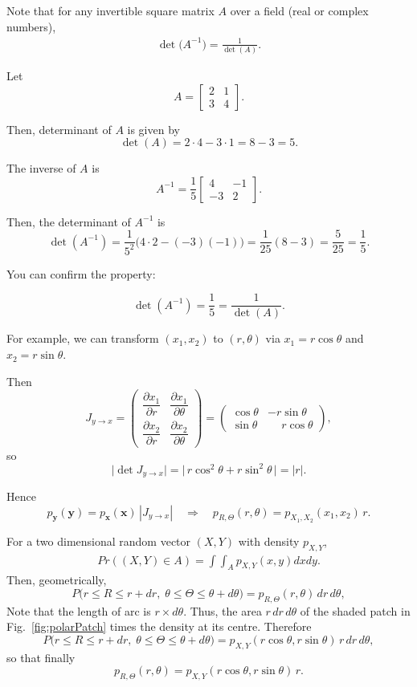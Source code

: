 Note that for any invertible square matrix $A$ over a field (\eg real or complex numbers),
\begin{align*}
	\det\bigl(A^{-1}\bigr)=\frac{1}{\det(A)}.
\end{align*}

Let
$$
A=\begin{bmatrix}
2 & 1\\[2pt]
3 & 4
\end{bmatrix}.
$$

Then, determinant of $A$ is given by
$$
\det(A)=2\cdot4-3\cdot1 = 8-3 = 5.
$$

The inverse of $A$ is 
$$
A^{-1}= \frac{1}{5}\begin{bmatrix}
4 & -1\\[2pt] -3 & 2
\end{bmatrix}.
$$

Then, the determinant of $A^{-1}$ is
$$
\det(A^{-1}) = \frac{1}{5^2}\bigl(4\cdot2-(-3)(-1)\bigr)
=\frac{1}{25}(8-3)=\frac{5}{25}=\frac{1}{5}.
$$

You can confirm the property:

$$
\det(A^{-1})=\frac{1}{5}=\frac{1}{\det(A)}.
$$


For example, we can transform $(x_1,x_2)$ to $(r,\theta)$ via $x_1=r\cos\theta$ and $x_2=r\sin\theta$.

Then
\[
J_{y\to x}=
\begin{pmatrix}
\dfrac{\partial x_1}{\partial r} & \dfrac{\partial x_1}{\partial\theta}\\[6pt]
\dfrac{\partial x_2}{\partial r} & \dfrac{\partial x_2}{\partial\theta}
\end{pmatrix}
=
\begin{pmatrix}
\cos\theta & -r\sin\theta\\
\sin\theta & \phantom{-}r\cos\theta
\end{pmatrix},
\tag{3}
\]
so
\[
\bigl|\det J_{y\to x}\bigr|
 = \bigl|\,r\cos^{2}\theta + r\sin^{2}\theta\,\bigr|
 = |r|.
\tag{4}
\]

Hence
\[
p_{\mathbf{y}}(\mathbf{y}) = p_{\mathbf{x}}(\mathbf{x})\,|J_{y\to x}|
\quad\Longrightarrow\quad
p_{R,\Theta}(r,\theta) = p_{X_1,X_2}(x_1,x_2)\,r.
\tag{5--6}
\]

For a two dimensional random vector $(X,Y)$ with density $p_{X,Y}$, 
\begin{align*}
	Pr((X,Y)\in A) = \int\int_A p_{X,Y}(x,y)dxdy.
\end{align*}
Then, geometrically,
\[
P\!\bigl(r\le R\le r+dr,\;
        \theta\le\Theta\le\theta+d\theta\bigr)
  = p_{R,\Theta}(r,\theta)\,dr\,d\theta,
\tag{7}
\]
Note that the length of arc is $r\times d\theta$. Thus, the area $r\,dr\,d\theta$ of the shaded patch in Fig.~\ref{fig:polarPatch} times the density at its centre.  Therefore
\[
P\!\bigl(r\le R\le r+dr,\;
        \theta\le\Theta\le\theta+d\theta\bigr)
  = p_{X,Y}(r\cos\theta, r\sin\theta)\,r\,dr\,d\theta,
\tag{8--9}
\]
so that finally
\[
p_{R,\Theta}(r,\theta)
  = p_{X,Y}(r\cos\theta, r\sin\theta)\,r.
\tag{10}
\]

